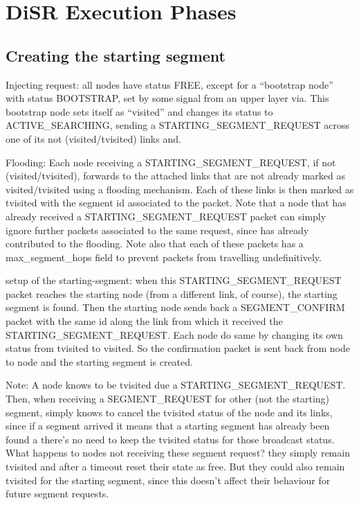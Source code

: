 \documentclass[conference]{IEEEtran}
\begin{document}
\section{DiSR Execution Phases}

\subsection{Creating the starting segment}

Injecting request: all nodes have status FREE, except for a
“bootstrap node” with status BOOTSTRAP, set by some signal from an
upper layer via. This bootstrap node sets itself as “visited” and
changes its status to ACTIVE_SEARCHING, sending a
STARTING_SEGMENT_REQUEST across one of its not (visited/tvisited)
links and.  

Flooding: Each node receiving a STARTING_SEGMENT_REQUEST,
if not (visited/tvisited),  forwards  to the attached links that are
not already marked as visited/tvisited using a flooding mechanism.
Each of these links is then marked as tvisited with the segment id
associated to the packet. Note that a node that has already received a
STARTING_SEGMENT_REQUEST packet can simply ignore further packets
associated to the same request, since has already contributed to the
flooding. Note also that each of these packets has a max_segment_hops
field to prevent packets from travelling undefinitively.  

setup of the starting-segment: when this STARTING_SEGMENT_REQUEST packet reaches
the starting node (from a different link, of course), the starting
segment is found. Then the starting node sends back a SEGMENT_CONFIRM
packet with the same id along the link from which it received the
STARTING_SEGMENT_REQUEST. Each node do same by changing its own status
from tvisited to visited. So the confirmation packet is sent back from
node to node and the starting segment is created. 

Note: A node knows to be tvisited due a  STARTING_SEGMENT_REQUEST.
Then, when receiving a SEGMENT_REQUEST for other (not the starting)
segment, simply knows to cancel the tvisited status of the node and
its links, since if a segment arrived it means that a starting segment
has already been found a there’s no need to keep the tvisited status
for those broadcast status. What happens to nodes not receiving these
segment request? they simply remain tvisited and after a timeout reset
their state as free. But they could also remain tvisited for the
starting segment, since this doesn’t affect their behaviour for future
segment requests.  
\end{document}
